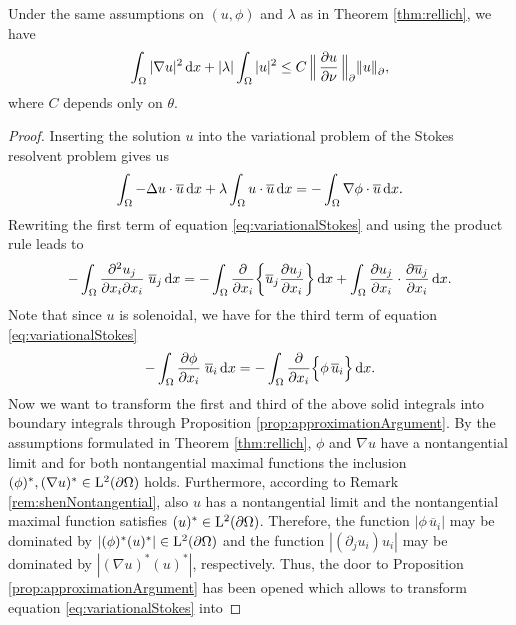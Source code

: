 \begin{lem}
  \label{lem:laxMilgramIneq}
  Under the same assumptions on $(u,\phi)$ and $\lambda$ as in Theorem \ref{thm:rellich}, we have
  \begin{align}
    \label{eq:laxMilgramIneq}
    \int_\Omega |\nabla u|^2 \, {\operatorname{d}\!{x}} + |\lambda| \int_\Omega |u|^2 \leq C \,\Big\|\, \frac{\partial u}{\partial \nu} \, \Big\|^{}_\partial  \|u\|^{}_\partial,
  \end{align}
  where $C$ depends only on $\theta$.
\end{lem}

\begin{proof}
  Inserting the solution $u$ into the variational problem of the Stokes resolvent problem gives us
  \begin{align}
    \label{eq:variationalStokes}
    \int_\Omega -\Delta u \cdot \overline u \, {\operatorname{d}\!{x}} + \lambda \int_\Omega u \cdot \overline u \, {\operatorname{d}\!{x}}= - \int_\Omega \nabla \phi \cdot \overline u \, {\operatorname{d}\!{x}}.
  \end{align}
  Rewriting the first term of equation \eqref{eq:variationalStokes} and using the product rule leads to 
  \begin{align*}
    -\int_{\Omega} \frac{\partial^2 u_j}{\partial x_i \partial x_i}  \; \overline u_j \, {\operatorname{d}\!{x}}
    = -\int_{\Omega} \frac{\partial }{\partial x_i} \bigg\{ \overline u_j \frac{\partial u_j}{\partial x_i} \bigg\} \, {\operatorname{d}\!{x}} + \int_\Omega \frac{\partial u_j}{\partial x_i} \cdot \frac{\partial \overline u_j}{\partial x_i} \, {\operatorname{d}\!{x}}.
    \end{align*}
  Note that since $u$ is solenoidal, we have for the third term of equation \eqref{eq:variationalStokes}
  \begin{align*}
    - \int_{\Omega} \frac{\partial \phi}{\partial x_i} \; \overline u_i \, {\operatorname{d}\!{x}} = - \int_{\Omega} \frac{\partial}{\partial x_i} \Big\{ \phi\,  \overline u_i \Big\} \, {\operatorname{d}\!{x}}.
  \end{align*}
  Now we want to transform the first and third of the above solid integrals into boundary integrals through Proposition \ref{prop:approximationArgument}.
  By the assumptions formulated in Theorem \ref{thm:rellich}, $\phi$ and $\nabla u$ have a nontangential limit and for both nontangential maximal functions the inclusion $(\phi)^*, (\nabla u)^* \in \mathrm{L}^2(\partial\Omega)$ holds. 
  Furthermore, according to Remark \ref{rem:shenNontangential}, also $u$ has a nontangential limit and the nontangential maximal function satisfies $(u)^* \in \mathrm{L}^2(\partial\Omega)$. 
  Therefore, the function $|\phi\,  \overline u_i |$ may be dominated by $|(\phi)^* (u)^*| \in \mathrm{L}^2(\partial\Omega)$ and the function $|(\partial_j u_i) u_i|$ may be dominated by $|(\nabla u)^* (u)^*|$, respectively. Thus, the door to Proposition \ref{prop:approximationArgument} has been opened which allows to transform equation \eqref{eq:variationalStokes} into

\end{proof}
